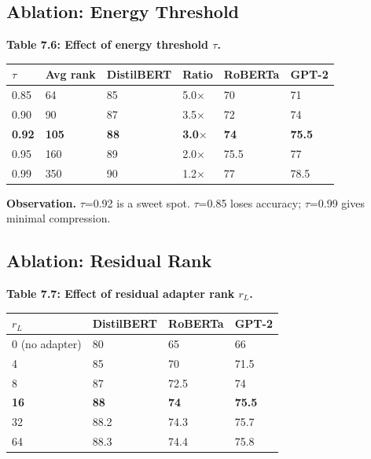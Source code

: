 \subsection{Ablation: Energy Threshold}

\textbf{Table 7.6: Effect of energy threshold $\tau$.}

\begin{table}[H]
\centering
\small
\begin{tabular}{llllll}
\toprule
\textbf{$\tau$} & \textbf{Avg rank} & \textbf{DistilBERT} & \textbf{Ratio} & \textbf{RoBERTa} & \textbf{GPT-2} \\
\midrule
0.85 & 64 & 85 & 5.0$\times$ & 70 & 71 \\
0.90 & 90 & 87 & 3.5$\times$ & 72 & 74 \\
\textbf{0.92} & \textbf{105} & \textbf{88} & \textbf{3.0$\times$} & \textbf{74} & \textbf{75.5} \\
0.95 & 160 & 89 & 2.0$\times$ & 75.5 & 77 \\
0.99 & 350 & 90 & 1.2$\times$ & 77 & 78.5 \\
\bottomrule
\end{tabular}
\end{table}

\textbf{Observation.} $\tau$=0.92 is a sweet spot. $\tau$=0.85 loses accuracy; $\tau$=0.99 gives 
minimal compression.

\subsection{Ablation: Residual Rank}

\textbf{Table 7.7: Effect of residual adapter rank $r_L$.}

\begin{table}[H]
\centering
\small
\begin{tabular}{llll}
\toprule
\textbf{$r_L$} & \textbf{DistilBERT} & \textbf{RoBERTa} & \textbf{GPT-2} \\
\midrule
0 (no adapter) & 80 & 65 & 66 \\
4 & 85 & 70 & 71.5 \\
8 & 87 & 72.5 & 74 \\
\textbf{16} & \textbf{88} & \textbf{74} & \textbf{75.5} \\
32 & 88.2 & 74.3 & 75.7 \\
64 & 88.3 & 74.4 & 75.8 \\
\bottomrule
\end{tabular}
\end{table}

